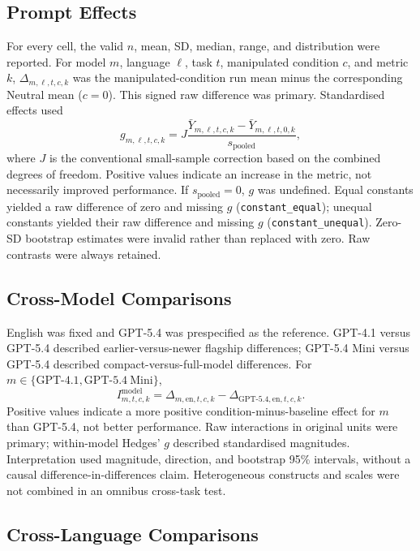 \documentclass[logo,msc,inf]{infthesis}       %
\begin{document}
\subsection{Prompt Effects}

For every cell, the valid $n$, mean, SD, median, range, and distribution were reported. For model $m$, language $\ell$, task $t$, manipulated condition $c$, and metric $k$, $\Delta_{m,\ell,t,c,k}$ was the manipulated-condition run mean minus the corresponding Neutral mean ($c=0$). This signed raw difference was primary. Standardised effects used
\[
g_{m,\ell,t,c,k}=J\frac{\bar Y_{m,\ell,t,c,k}-\bar Y_{m,\ell,t,0,k}}{s_{\mathrm{pooled}}},
\]
where $J$ is the conventional small-sample correction based on the combined degrees of freedom. Positive values indicate an increase in the metric, not necessarily improved performance. If $s_{\mathrm{pooled}}=0$, $g$ was undefined. Equal constants yielded a raw difference of zero and missing $g$ (\texttt{constant\_equal}); unequal constants yielded their raw difference and missing $g$ (\texttt{constant\_unequal}). Zero-SD bootstrap estimates were invalid rather than replaced with zero. Raw contrasts were always retained.

\subsection{Cross-Model Comparisons}
English was fixed and GPT-5.4 was prespecified as the reference. GPT-4.1 versus GPT-5.4 described earlier-versus-newer flagship differences; GPT-5.4 Mini versus GPT-5.4 described compact-versus-full-model differences. For $m\in\{\mathrm{GPT\mbox{-}4.1},\mathrm{GPT\mbox{-}5.4\ Mini}\}$,
\[
I^{\mathrm{model}}_{m,t,c,k}=\Delta_{m,\mathrm{en},t,c,k}-\Delta_{\mathrm{GPT\mbox{-}5.4},\mathrm{en},t,c,k}.
\]
Positive values indicate a more positive condition-minus-baseline effect for $m$ than GPT-5.4, not better performance. Raw interactions in original units were primary; within-model Hedges' $g$ described standardised magnitudes. Interpretation used magnitude, direction, and bootstrap 95\% intervals, without a causal difference-in-differences claim. Heterogeneous constructs and scales were not combined in an omnibus cross-task test.

\subsection{Cross-Language Comparisons}
\end{document}
